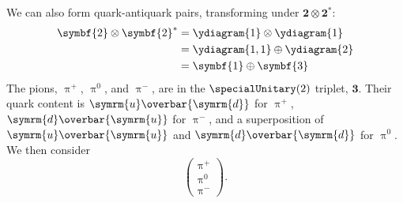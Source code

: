 \documentclass[fleqn]{NotesClass}
\newcommand{\Pparticle}[1]{\symrm{#1}}
\newcommand{\Pu}{\ensuremath{\Pparticle{u}}}
\newcommand{\Pd}{\ensuremath{\Pparticle{d}}}
\newcommand{\Ppip}{\ensuremath{\uppi^+}}
\newcommand{\Ppizero}{\ensuremath{\uppi^0}}
\newcommand{\Ppim}{\ensuremath{\uppi^-}}
\newcommand{\APantiparticle}[1]{\overbar{#1}}
\newcommand{\APu}{\ensuremath{\APantiparticle{\Pparticle{u}}}}
\newcommand{\APd}{\ensuremath{\APantiparticle{\Pparticle{d}}}}
\newcommand{\rep}[1]{\symbf{#1}}
\begin{document}
    We can also form quark-antiquark pairs, transforming under \(\rep{2} \otimes \rep{2}^*\):
    \begin{align}
        \rep{2} \otimes \rep{2}^* &= \ydiagram{1} \otimes \ydiagram{1}\\
        &= \ydiagram{1,1} \oplus \ydiagram{2}\\
        &= \rep{1} \oplus \rep{3}
    \end{align}
    The pions, \(\Ppip\), \(\Ppizero\), and \(\Ppim\), are in the \(\specialUnitary(2)\) triplet, \(\rep{3}\).    Their quark content is \(\Pu\APd\) for \(\Ppip\), \(\Pd\APu\) for \(\Ppim\), and a superposition of \(\Pu\APu\) and \(\Pd\APd\) for \(\Ppizero\).
    We then consider
    \begin{equation}
        \begin{pmatrix}
            \Ppip\\ \Ppizero\\ \Ppim
        \end{pmatrix}
        .
    \end{equation}
    
\end{document}

